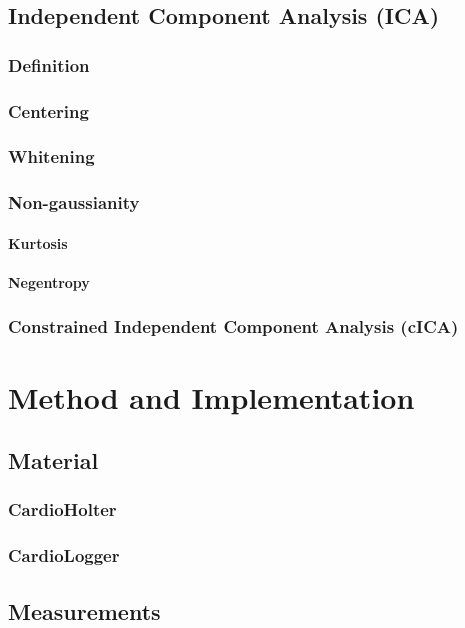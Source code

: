 \documentclass{report}
\begin{document}
\section{Independent Component Analysis (ICA)}
\subsection{Definition}
\subsection{Centering}
\subsection{Whitening}
\subsection{Non-gaussianity}
\subsubsection{Kurtosis}
\subsubsection{Negentropy}


\subsection{Constrained Independent Component Analysis (cICA)}


\chapter{Method and Implementation}
 \vspace{-0.6cm}
\section{Material}

\subsection{CardioHolter}
\subsection{CardioLogger}

\section{Measurements}
\end{document}
